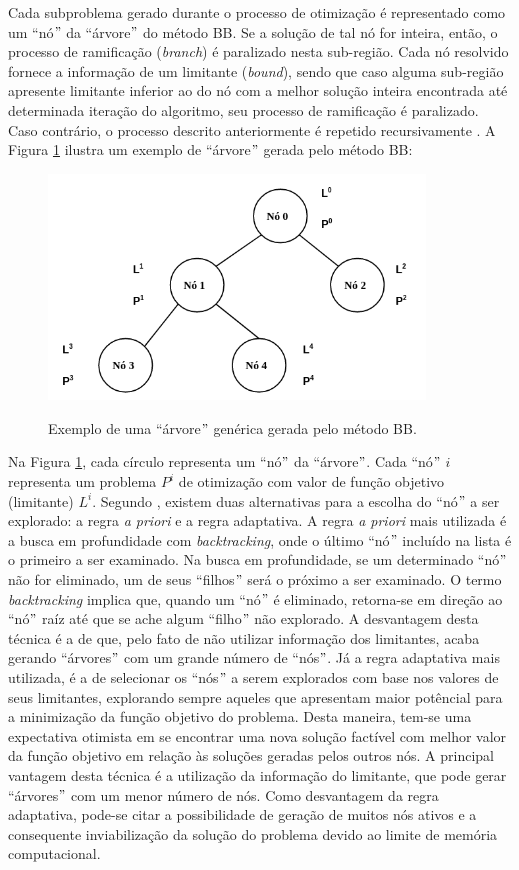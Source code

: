 \documentclass[
	12pt,				%
	openany,			%
	twoside,			%
	a4paper,			%
	chapter=TITLE,		%
	section=Title,		%
	subsection=Title,	%
	subsubsection=Title,%
	english,			%
	french,				%
	spanish,			%
	brazil			%
	]{abntex2}
\begin{document}
\begin{ERRATA}
Cada subproblema gerado durante o processo de otimização é representado como um ``nó$"$ da ``árvore$"$ do método BB. Se a solução de tal nó for inteira, então, o processo de ramificação (\emph{branch}) é paralizado nesta sub-região. Cada nó resolvido fornece a informação de um limitante (\emph{bound}), sendo que caso alguma sub-região apresente limitante inferior ao do nó com a melhor solução inteira encontrada até determinada iteração do algoritmo, seu processo de ramificação é paralizado. Caso contrário, o processo descrito anteriormente é repetido recursivamente \cite{teseEdilaine}. A Figura \ref{bb} ilustra um exemplo de ``árvore$"$ gerada pelo método BB:


\begin{figure}[!h]
\centering
\caption{Exemplo de uma ``árvore$"$ genérica gerada pelo método BB.}
\includegraphics[width=100mm]{images/bbthree.png}
\label{bb}
\end{figure}


Na Figura \ref{bb}, cada círculo representa um ``nó$"$ da ``árvore$"$. Cada ``nó$"$ $i$ representa um problema $P^{i}$ de otimização com valor de função objetivo (limitante) $L^i$. Segundo , existem duas alternativas para a escolha do ``nó$"$ a ser explorado: a regra \emph{a priori} e a regra adaptativa. A regra \emph{a priori} mais utilizada é a busca em profundidade com \emph{backtracking}, onde o último ``nó$"$ incluído na lista é o primeiro a ser examinado. Na busca em profundidade, se um determinado ``nó$"$ não for eliminado, um de seus ``filhos$"$ será o próximo a ser examinado. O termo \emph{backtracking} implica que, quando um ``nó$"$ é eliminado, retorna-se em direção ao ``nó$"$ raíz até que se ache algum ``filho$"$ não explorado. A desvantagem desta técnica é a de que, pelo fato de não utilizar informação dos limitantes, acaba gerando ``árvores$"$ com um grande número de ``nós$"$. Já a regra adaptativa mais utilizada, é a de selecionar os ``nós$"$ a serem explorados com base nos valores de seus limitantes, explorando sempre aqueles que apresentam maior potêncial para a minimização da função objetivo do problema. Desta maneira, tem-se uma expectativa otimista em se encontrar uma nova solução factível com melhor valor da função objetivo em relação às soluções geradas pelos outros nós. A principal vantagem desta técnica é a utilização da informação do limitante,  que pode gerar ``árvores$"$ com um menor número de nós. Como desvantagem da regra adaptativa, pode-se citar a possibilidade de geração de muitos nós ativos e a consequente inviabilização da solução do problema devido ao limite de memória computacional.


\end{ERRATA}
\end{document}
